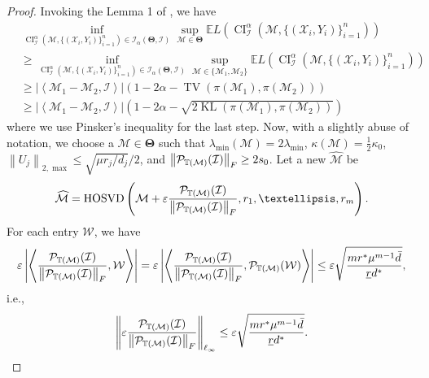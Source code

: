 \documentclass[12pt]{article}
\newcommand{\tF}{{\rm F}}
\newcommand{\abs}[1]{\left\lvert#1\right\rvert}
\newcommand{\norm}[1]{\left\lVert#1\right\rVert}
\newcommand{\cP}{\mathcal{P}}
\newcommand{\cM}{\mathcal{M}}
\newcommand{\cI}{\mathcal{I}}
\newcommand{\cX}{\mathcal{X}}
\def\calW{{\mathcal W}}
\def\TT{{\mathbb T}}
\newcommand{\dmax}{\bar{d}}
\theoremstyle{plain}
\begin{document}
\begin{proof}
   Invoking the Lemma 1 of \cite{cai2017confidence}, we have 
    \begin{equation*}
       \begin{aligned}
            &\inf_{\operatorname{CI}_{\mathcal{I}}^\alpha\left(\cM, \{(\cX_i,Y_i)\}_{i=1}^n \right) \in \mathcal{I}_\alpha(\boldsymbol{\Theta}, \cI) } \sup _{\cM\in \boldsymbol{\Theta} } \mathbb{E} L\left(\operatorname{CI}_{\mathcal{I}}^\alpha\left(\cM, \{(\cX_i,Y_i)\}_{i=1}^n \right)\right) 
        \\
        & \ge  \inf_{\operatorname{CI}_{\mathcal{I}}^\alpha\left(\cM, \{(\cX_i,Y_i)\}_{i=1}^n \right) \in \mathcal{I}_\alpha(\boldsymbol{\Theta}, \cI) } \sup _{\cM\in \{\cM_1,\cM_2 \} } \mathbb{E} L\left(\operatorname{CI}_{\mathcal{I}}^\alpha\left(\cM, \{(\cX_i,Y_i)\}_{i=1}^n \right)\right)
        \\
        & \ge \abs{\left\langle \cM_1-\cM_2,\cI\right\rangle} \left(1-2\alpha-\operatorname{TV}(\pi(\cM_1),\pi(\cM_2)) \right)
        \\
        & \ge \abs{\left\langle \cM_1-\cM_2,\cI\right\rangle} \left(1-2\alpha-\sqrt{2\operatorname{KL}(\pi(\cM_1),\pi(\cM_2))} \right)
       \end{aligned}
    \end{equation*}
where we use Pinsker’s inequality for the last step. Now, with a slightly abuse of notation, we choose a $\cM\in\boldsymbol{\Theta}$ such that $\lambda_{\min}(\cM)=2\lambda_{\min}$, $\kappa(\cM)=\frac{1}{2}\kappa_0$, $\norm{U_j}_{2,\max}\le\sqrt{\mu r_j/d_j}/2$, and $\norm{\cP_{\TT(\cM)}(\cI)}_{\tF}\ge 2s_0$. Let a new $\widehat{\cM}$ be 
\begin{equation*}
    \widehat{\cM} = \operatorname{HOSVD}\left(\cM+\varepsilon\frac{\cP_{\TT(\cM)}(\cI)}{\norm{\cP_{\TT(\cM)}(\cI)}_{\tF}},r_1,\dots,r_m\right).
\end{equation*}
For each entry $\calW$, we have
\begin{equation*}
    \varepsilon\abs{\left\langle\frac{\cP_{\TT(\cM)}(\cI)}{\norm{\cP_{\TT(\cM)}(\cI)}_{\tF}},\calW\right\rangle}=  \varepsilon\abs{\left\langle\frac{\cP_{\TT(\cM)}(\cI)}{\norm{\cP_{\TT(\cM)}(\cI)}_{\tF}},\cP_{\TT(\cM)}(\calW)\right\rangle} \le \varepsilon\sqrt{\frac{mr^*\mu^{m-1}\dmax}{\underline{r}d^*}},
\end{equation*}
i.e.,
\begin{equation*}
    \norm{\varepsilon\frac{\cP_{\TT(\cM)}(\cI)}{\norm{\cP_{\TT(\cM)}(\cI)}_{\tF}}}_{\ell_{\infty}} \le \varepsilon\sqrt{\frac{mr^*\mu^{m-1}\dmax}{\underline{r}d^*}}.

\end{equation*}
\end{proof}
\end{document}
